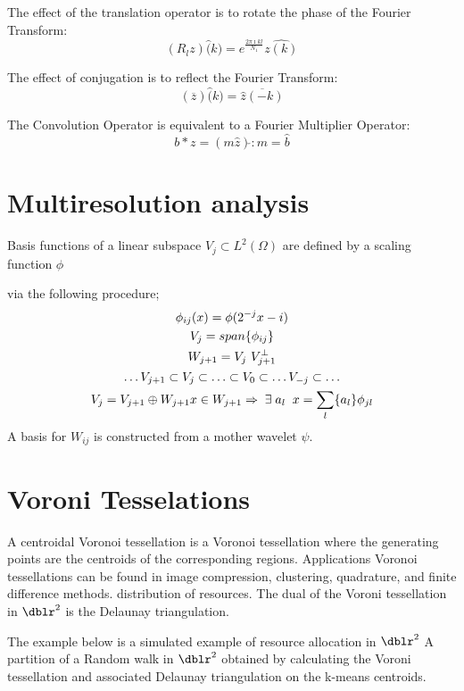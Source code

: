 The effect of the translation operator is to rotate the phase
of the Fourier Transform:
\begin{equation*}
(R_l z)\hat(k)=e^{ \frac{2 \pi \imath k l}{N_1}}\widehat{z(k)}
\end{equation*}

The effect of conjugation is to reflect the Fourier Transform:
\begin{equation*}
(\overline{z})\hat(k)=\overline{\hat z(-k)}
\end{equation*}


The Convolution Operator is equivalent to a Fourier Multiplier
Operator:
\begin{equation*}
b * z=(m \hat z )\check{} \! : m=\hat b
\end{equation*}

\section{Multiresolution analysis} Basis functions of a linear
subspace $V_j \subset L^2(\Omega)$ are
defined by a scaling function $\phi$ 

via the following procedure;
\begin{gather*}
\phi_{ij}(x) = \phi(2^{-j} x-i)  \\
V_j = span \{ \phi_{ij} \} \\
W_{j+1}= V_j \ V_{j+1}^\bot \\
\hdots V_{j+1} \subset V_j \subset \hdots \subset V_0 \subset \hdots V_{-j}  \subset \hdots \\
V_j=V_{j+1} \oplus W_{j+1} x \in W_{j+1} \Rightarrow \; \exists \;
{a_l} \;\; x=\sum_l \{a_l\} \phi_{jl}
\end{gather*}
A basis for $W_{ij}$ is constructed from a mother wavelet
$\psi$.

\section{Voroni Tesselations}
A centroidal Voronoi tessellation is a Voronoi tessellation where the
generating points are the centroids of the corresponding regions.
Applications Voronoi tessellations can be found in image compression,
clustering, quadrature, and finite difference methods. distribution of
resources.  The dual of the Voroni tessellation in $\dblr^2$ is the Delaunay
triangulation.

The example below is a simulated example of resource allocation in $\dblr^2$
A partition of a Random walk in $\dblr^2$ obtained by calculating the Voroni
tessellation and associated Delaunay triangulation on the k-means centroids.

